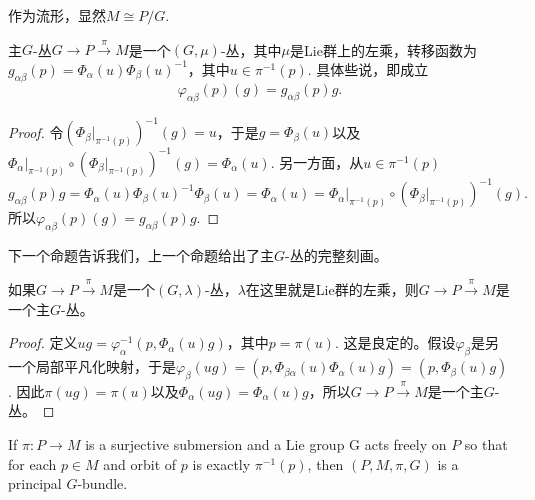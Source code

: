 作为流形，显然$M\cong P/G$.

\begin{pro}\label{pro:8}
主$G$-丛$G\to P\xrightarrow{\pi}M$是一个$(G,\mu)$-丛，其中$\mu$是Lie群上的左乘，转移函数为$g_{\alpha\beta}(p)=\Phi_{\alpha}(u)\Phi_{\beta}(u)^{-1}$，其中$u\in \pi^{-1}(p)$. 具体些说，即成立
\[
	\varphi_{\alpha\beta}(p)(g)=g_{\alpha\beta}(p)g.
\]
\end{pro}

\begin{proof}
	令$\left(\Phi_{\beta}|_{\pi^{-1}(p)}\right)^{-1}(g)=u$，于是$g=\Phi_\beta(u)$以及$\Phi_{\alpha}|_{\pi^{-1}(p)}\circ \left(\Phi_{\beta}|_{\pi^{-1}(p)}\right)^{-1}(g)=\Phi_{\alpha}(u)$. 另一方面，从$u\in \pi^{-1}(p)$
	\[
		g_{\alpha\beta}(p)g=\Phi_{\alpha}(u)\Phi_{\beta}(u)^{-1}\Phi_\beta(u)=\Phi_{\alpha}(u)=\Phi_{\alpha}|_{\pi^{-1}(p)}\circ \left(\Phi_{\beta}|_{\pi^{-1}(p)}\right)^{-1}(g).
	\]
	所以$\varphi_{\alpha\beta}(p)(g)=g_{\alpha\beta}(p)g$.
\end{proof}

下一个命题告诉我们，上一个命题给出了主$G$-丛的完整刻画。

\begin{pro}
如果$G\to P\xrightarrow{\pi}M$是一个$(G,\lambda)$-丛，$\lambda$在这里就是Lie群的左乘，则$G\to P\xrightarrow{\pi}M$是一个主$G$-丛。
\end{pro}

\begin{proof}
定义$ug=\varphi_{\alpha}^{-1}(p,\Phi_{\alpha}(u)g)$，其中$p=\pi(u)$. 这是良定的。假设$\varphi_\beta$是另一个局部平凡化映射，于是$\varphi_\beta(ug)=(p,\Phi_{\beta\alpha}(u)\Phi_\alpha(u)g)=(p,\Phi_{\beta}(u)g)$. 因此$\pi(ug)=\pi(u)$以及$\Phi_{\alpha}(ug)=\Phi_{\alpha}(u)g$，所以$G\to P\xrightarrow{\pi}M$是一个主$G$-丛。
\end{proof}


\begin{thm}
If $\pi:P\to M$ is a surjective submersion and a Lie group G acts freely on $P$ so that for each $p\in M$ and orbit of $p$ is exactly $\pi^{-1}(p)$, then $(P,M,\pi,G)$ is a principal $G$-bundle.
\end{thm}

